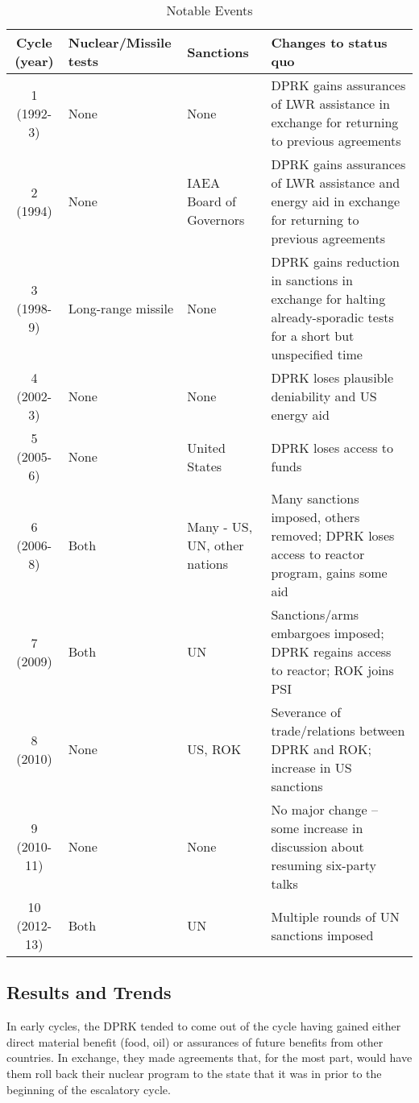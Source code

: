 \documentclass{article}
\begin{document}
\begin{table}[H]
	\caption{Notable Events} 
	\begin{tabular}{|c|p{2.3cm}|p{1.5cm}|p{6cm}|}
	\hline
	Cycle (year) & Nuclear/Missile tests & Sanctions & Changes to status quo \\ 
	\hline
	1 (1992-3) & None & None & DPRK gains assurances of LWR assistance in exchange for returning to previous agreements \\ 
	\hline
	2 (1994) & None & IAEA Board of Governors & DPRK gains assurances of LWR assistance and energy aid in exchange for returning to previous agreements \\ 
	\hline
	3 (1998-9) & Long-range missile & None & DPRK gains reduction in sanctions in exchange for halting already-sporadic tests for a short but unspecified time \\ 
	\hline
	4 (2002-3) & None & None & DPRK loses plausible deniability and US energy aid \\ 
	\hline
	5 (2005-6) & None & United States & DPRK loses access to funds\\ 
	\hline
	6 (2006-8) & Both & Many - US, UN, other nations & Many sanctions imposed, others removed; DPRK loses access to reactor program, gains some aid \\ 
	\hline
	7 (2009) & Both & UN & Sanctions/arms embargoes imposed; DPRK regains access to reactor; ROK joins PSI \\ 
	\hline
	8 (2010) & None & US, ROK & Severance of trade/relations between DPRK and ROK; increase in US sanctions \\ 
	\hline
	9 (2010-11) & None & None & No major change – some increase in discussion about resuming six-party talks \\ 
	\hline
	10 (2012-13) & Both & UN & Multiple rounds of UN sanctions imposed \\
	\hline
	\end{tabular} 
\end{table}

\subsection{Results and Trends}

In early cycles, the DPRK tended to come out of the cycle having gained either direct material benefit (food, oil) or assurances of future benefits from other countries. In exchange, they made agreements that, for the most part, would have them roll back their nuclear program to the state that it was in prior to the beginning of the escalatory cycle.
\end{document}
